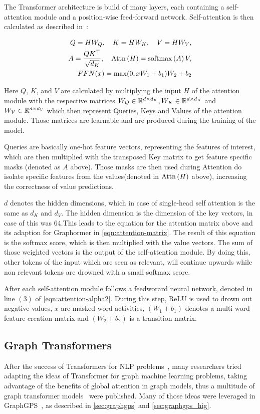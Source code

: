 The Transformer architecture is build of many layers, each containing a self-attention module and a position-wise feed-forward network. Self-attention is then calculated as described in~\cite{2021graphormer}:

\begin{align}
    Q = HW_Q,\quad K = HW_K,\quad V = HW_V,\label{eqn:attention-alpha} \\
    A = \frac{QK^\top}{\sqrt{d_K}}, \quad \mathrm{Attn}\left(H\right) = \mathrm{softmax}\left(A\right)V, \\
    FFN(x) = \max(0,xW_1 + b_1)W_2 + b_2
    \label{eqn:attention-alpha2}
\end{align}

Here $Q$, $K$, and $V$ are calculated by multiplying the input $H$ of the attention module with the respective matrices $W_Q\in\mathbb{R}^{d\times d_K}, W_K\in\mathbb{R}^{d\times d_K}$ and $ W_V\in\mathbb{R}^{d\times d_V}$ which then represent Queries, Keys and Values of the attention module. Those matrices are learnable and are produced during the training of the model.

Queries are basically one-hot feature vectors, representing the features of interest, which are then multiplied with the transposed Key matrix to get feature specific masks (denoted as $A$ above). Those masks are then used during Attention do isolate specific features from the values(denoted in $\mathrm{Attn}\left(H\right)$ above), increasing the correctness of value predictions.

$d$ denotes the hidden dimensions, which in case of single-head self attention is the same as $d_K$ and $d_V$. The hidden dimension is the dimension of the key vectors, in case of \cite{vaswani2017attention} this was $64$.This leads to the equation for the attention matrix above and its adaption for Graphormer in \autoref{eqn:attention-matrix}. The result of this equation is the softmax score, which is then multiplied with the value vectors. The sum of those weighted vectors is the output of the self-attention module. By doing this, other tokens of the input which are seen as relevant, will continue upwards while non relevant tokens are drowned with a small softmax score.

After each self-attention module follows a feedworard neural network, denoted in line $(3)$ of \autoref{eqn:attention-alpha2}. During this step, ReLU is used to drown out negative values, $x$ are masked word activities, $(W_1 + b_1)$ denotes a multi-word feature creation matrix and $(W_2 + b_2)$ is a transition matrix.

\subsection{Graph Transformers}
After the success of Transformers for NLP problems~\cite{kalyan2021ammus}, many researchers tried adapting the ideas of Transformer for graph machine learning problems, taking advantage of the benefits of global attention in graph models, thus a multitude of graph transformer models~\cite{dwivedi2021generalizationTransformer,2021graphormer,kreuzer2021rethinking,mialon2021graphit,wu2022representing} were published. Many of those ideas were leveraged in GraphGPS~\cite{2023graphgps}, as described in \ref{sec:graphgps} and \ref{sec:graphgps_hig}.

